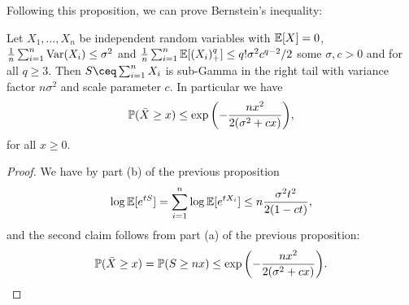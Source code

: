 Following this proposition, we can prove Bernstein's inequality:
\begin{theorem}
	Let $X_1, \dotsc, X_n$ be independent random variables with $\mathbb E[X] = 0$, $\frac1n\sum_{i=1}^n \operatorname{Var}(X_i) \leq \sigma^2$ and $\frac1n \sum_{i=1}^n \mathbb E[(X_i)_+^q] \leq q! \sigma^2 c^{q-2}/2$ some $\sigma, c > 0$ and for all $q \geq 3$. Then $S \ceq \sum_{i=1}^n X_i$ is sub-Gamma in the right tail with variance factor $n\sigma^2$ and scale parameter $c$. In particular we have
	\[
	\mathbb P(\bar X \geq x) \leq \exp\qty(- \frac{nx^2}{2(\sigma^2 + cx)}),
	\]
	for all $x \geq 0$. 
\end{theorem}

\begin{proof}
	We have by part (b) of the previous proposition
	\[
	\log\mathbb E[e^{tS}] = \sum_{i=1}^n \log \mathbb E[e^{tX_i}] \leq n \frac{\sigma^2 t^2}{2(1 - ct)},
	\]
	and the second claim follows from part (a) of the previous proposition:
	\[
	\mathbb P(\bar X \geq x) = \mathbb P(S \geq nx) \leq \exp\qty(- \frac{nx^2}{2(\sigma^2 + cx)}). 
	\]
\end{proof}
